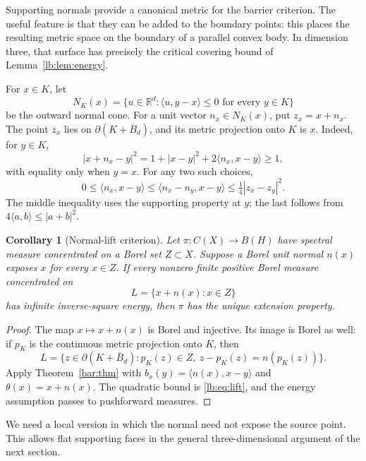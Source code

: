 \documentclass[11pt,letterpaper]{amsart}
\newtheorem{corollary}[theorem]{Corollary}
\theoremstyle{definition}
\theoremstyle{remark}
\numberwithin{equation}{section}
\begin{document}
Supporting normals provide a canonical metric for the barrier
criterion. The useful feature is that they can be added to the
boundary points: this places the resulting metric space on the
boundary of a parallel convex body. In dimension three, that
surface has precisely the critical covering bound of
Lemma~\ref{lb:lem:energy}.

For $x\in K$, let
\[
 N_K(x)=\{u\in\mathbb R^d:
               \langle u,y-x\rangle\le0\text{ for every }y\in K\}
\]
be the outward normal cone. For a unit vector $n_x\in N_K(x)$,
put $z_x=x+n_x$. The point $z_x$ lies on
$\partial(K+\overline B_d)$, and its metric projection onto
$K$ is $x$. Indeed, for $y\in K$,
\[
 |x+n_x-y|^2
 =1+|x-y|^2+2\langle n_x,x-y\rangle\ge1,
\]
with equality only when $y=x$. For any two such choices,
\begin{equation}\label{lb:eq:lift}
 0\le\langle n_x,x-y\rangle
 \le\langle n_x-n_y,x-y\rangle
 \le\tfrac14|z_x-z_y|^2.
\end{equation}
The middle inequality uses the supporting property at $y$;
the last follows from $4\langle a,b\rangle\le|a+b|^2$.

\begin{corollary}[Normal-lift criterion]\label{cap:thm}
Let $\pi:C(X)\to B(H)$ have spectral measure concentrated
on a Borel set $Z\subset X$. Suppose a Borel unit normal
$n(x)$ exposes $x$ for every $x\in Z$. If every nonzero finite
positive Borel measure concentrated on
\[
                        L=\{x+n(x):x\in Z\}
\]
has infinite inverse-square energy, then $\pi$ has the unique
extension property.
\end{corollary}
\begin{proof}
The map $x\mapsto x+n(x)$ is Borel and injective. Its image
is Borel as well: if $p_K$ is the continuous metric projection
onto $K$, then
\[
 L=\{z\in\partial(K+\overline B_d):
        p_K(z)\in Z,\ z-p_K(z)=n(p_K(z))\}.
\]
Apply Theorem~\ref{bar:thm} with
$b_x(y)=\langle n(x),x-y\rangle$ and
$\theta(x)=x+n(x)$. The quadratic bound is
\eqref{lb:eq:lift}, and the energy assumption passes to
pushforward measures.
\end{proof}

We need a local version in which the normal need not expose
the source point. This allows flat supporting faces in the general
three-dimensional argument of the next section.
\end{document}
